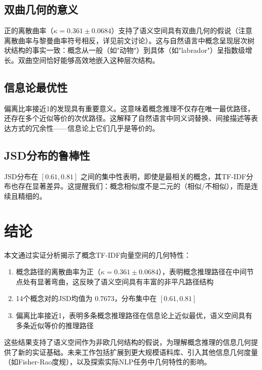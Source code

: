 \documentclass[
 UTF8,
 fontset=mac,
]{ctexart}
\begin{document}
\subsection{双曲几何的意义}\label{hyperbolic-geometry}

正的离散曲率（$\kappa = 0.361 \pm 0.0684$）支持了语义空间具有双曲几何的假说（注意离散曲率与黎曼曲率符号相反，详见前文讨论）。这与自然语言中概念呈现层次树状结构的事实一致：概念从一般（如"动物"）到具体（如"labrador"）呈指数级增长。双曲空间恰好能够高效地嵌入这种层次结构。

\subsection{信息论最优性}\label{information-theoretic-optimality}

偏离比率接近1的发现具有重要意义。这意味着概念推理不仅存在唯一最优路径，还存在多个近似等价的次优路径。这解释了自然语言中同义词替换、间接描述等表达方式的冗余性——信息论上它们几乎是等价的。

\subsection{JSD分布的鲁棒性}\label{jsd-robustness}

JSD分布在 $[0.61, 0.81]$ 之间的集中性表明，即使是最相关的概念，其TF-IDF分布也存在显著差异。这提醒我们：概念相似度不是二元的（相似/不相似），而是连续且精细的。

\section{结论}\label{conclusion}

本文通过实证分析揭示了概念TF-IDF向量空间的几何特性：
\begin{enumerate}
    \item 概念路径的离散曲率为正（$\kappa = 0.361 \pm 0.0684$），表明概念推理路径在中间节点处有显著弯曲，这反映了语义空间具有丰富的非平凡路径结构
    \item 14个概念对的JSD均值为 $0.7673$，分布集中在 $[0.61, 0.81]$
    \item 偏离比率接近1，表明多条概念推理路径在信息论上近似最优，语义空间具有多条近似等价的推理路径
\end{enumerate}

这些结果支持了语义空间作为非欧几何结构的假说，为理解概念推理的信息几何提供了新的实证基础。未来工作包括扩展到更大规模语料库、引入其他信息几何度量（如Fisher-Rao度规），以及探索实际NLP任务中几何特性的影响。
\end{document}

